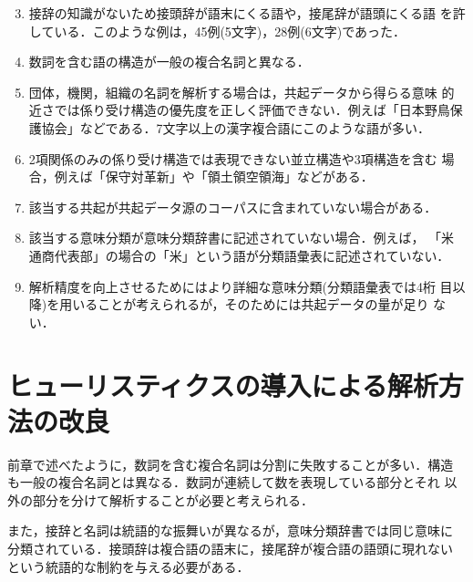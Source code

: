 \begin{enumerate}
\setcounter{enumi}{2}  
\item 接辞の知識がないため接頭辞が語末にくる語や，接尾辞が語頭にくる語
を許している．このような例は，45例(5文字)，28例(6文字)であった．
\item 数詞を含む語の構造が一般の複合名詞と異なる．
\item 団体，機関，組織の名詞を解析する場合は，共起データから得らる意味
的近さでは係り受け構造の優先度を正しく評価できない．例えば「日本野鳥保
護協会」などである．7文字以上の漢字複合語にこのような語が多い．
\item 2項関係のみの係り受け構造では表現できない並立構造や3項構造を含む
場合，例えば「保守対革新」や「領土領空領海」などがある．
\item 該当する共起が共起データ源のコーパスに含まれていない場合がある．
\item 該当する意味分類が意味分類辞書に記述されていない場合．例えば，
「米通商代表部」の場合の「米」という語が分類語彙表に記述されていない．
\item 解析精度を向上させるためにはより詳細な意味分類(分類語彙表では4桁
目以降)を用いることが考えられるが，そのためには共起データの量が足り
ない．
\end{enumerate}

\section{ヒューリスティクスの導入による解析方法の改良}
\label{sec:imp}

前章で述べたように，数詞を含む複合名詞は分割に失敗することが多い．構造
も一般の複合名詞とは異なる．数詞が連続して数を表現している部分とそれ
以外の部分を分けて解析することが必要と考えられる．

また，接辞と名詞は統語的な振舞いが異なるが，意味分類辞書では同じ意味に
分類されている．接頭辞は複合語の語末に，接尾辞が複合語の語頭に現れない
という統語的な制約を与える必要がある．

